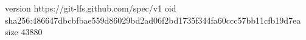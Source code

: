 version https://git-lfs.github.com/spec/v1
oid sha256:486647dbcbfbae559d86029bd2ad06f2bd1735f344fa60ccc57bb11cfb19d7ea
size 43880
